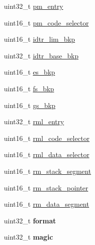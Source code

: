 \begin{DoxyCompactItemize}
uint32\+\_\+t \mbox{\hyperlink{structRTEMS__PACKED_a18b4b03991d0ebfcac4255084745bca1}{pm\+\_\+entry}}
\item 
uint16\+\_\+t \mbox{\hyperlink{structRTEMS__PACKED_a2978ebd9fd514f6255fbc60684245a37}{pm\+\_\+code\+\_\+selector}}
\item 
uint16\+\_\+t \mbox{\hyperlink{structRTEMS__PACKED_a3ebaf8f47f8f74a6796f9c74e788fd4a}{idtr\+\_\+lim\+\_\+bkp}}
\item 
uint32\+\_\+t \mbox{\hyperlink{structRTEMS__PACKED_ab7d93886bcba775366dc5cbfeeceebce}{idtr\+\_\+base\+\_\+bkp}}
\item 
uint16\+\_\+t \mbox{\hyperlink{structRTEMS__PACKED_af5ca830a4b6bd69fa2f819d16b3ee75a}{es\+\_\+bkp}}
\item 
uint16\+\_\+t \mbox{\hyperlink{structRTEMS__PACKED_af400d640d9797e47b04cb4b643554105}{fs\+\_\+bkp}}
\item 
uint16\+\_\+t \mbox{\hyperlink{structRTEMS__PACKED_aefb473e38ec64e5c4a9b7796f1613923}{gs\+\_\+bkp}}
\item 
uint32\+\_\+t \mbox{\hyperlink{structRTEMS__PACKED_aa8d92c8fcebd0a831db31fd7e1e1ca16}{rml\+\_\+entry}}
\item 
uint16\+\_\+t \mbox{\hyperlink{structRTEMS__PACKED_a4f3c8b92ffc62632fd4fb1f197587f51}{rml\+\_\+code\+\_\+selector}}
\item 
uint16\+\_\+t \mbox{\hyperlink{structRTEMS__PACKED_a8b783a739190248cf9a96038e5875f37}{rml\+\_\+data\+\_\+selector}}
\item 
uint16\+\_\+t \mbox{\hyperlink{structRTEMS__PACKED_a0404760f96a07f703b889b179d1e22f4}{rm\+\_\+stack\+\_\+segment}}
\item 
uint16\+\_\+t \mbox{\hyperlink{structRTEMS__PACKED_aff386047458c688ee06846e21211d9bd}{rm\+\_\+stack\+\_\+pointer}}
\item 
uint16\+\_\+t \mbox{\hyperlink{structRTEMS__PACKED_a1aa15a6558d0fd03f8f3437fa74c2b8c}{rm\+\_\+data\+\_\+segment}}
\item 
\mbox{\label{structRTEMS__PACKED_a55b2aeaf5fa7a1544dd122fe9ee74e68}} 
uint32\+\_\+t {\bfseries format}
\item 
\mbox{\label{structRTEMS__PACKED_a6a81ada58ee72c34ffb25a009392d9bb}} 
uint32\+\_\+t {\bfseries magic}
\item 
\mbox{\label{structRTEMS__PACKED_ab1908585a8f74e506c8623cdff8dd040}} 

\end{DoxyCompactItemize}
